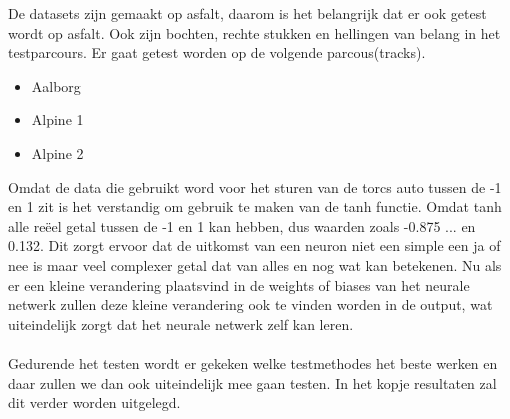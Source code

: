 De datasets zijn gemaakt op asfalt, daarom is het belangrijk dat er ook getest wordt op asfalt. Ook zijn bochten, rechte stukken en hellingen van belang in het testparcours. Er gaat getest worden op de volgende parcous(tracks).
\begin{itemize}
\item Aalborg
\item Alpine 1
\item Alpine 2
\end{itemize}
Omdat de data die gebruikt word voor het sturen van de torcs auto tussen de -1 en 1 zit is het verstandig om gebruik te maken van de tanh functie. Omdat tanh alle reëel getal tussen de -1 en 1 kan hebben, dus waarden zoals -0.875 ... en 0.132. Dit zorgt ervoor dat de uitkomst van een neuron niet een simple een ja of nee is maar veel complexer getal dat van alles en nog wat kan betekenen. Nu als er een kleine verandering plaatsvind in de weights of biases van het neurale netwerk zullen deze kleine verandering ook te vinden worden in de output, wat uiteindelijk zorgt dat het neurale netwerk zelf kan leren.\\\\
Gedurende het testen wordt er gekeken welke testmethodes het beste werken en daar zullen we dan ook uiteindelijk mee gaan testen. In het kopje resultaten zal dit verder worden uitgelegd. 
